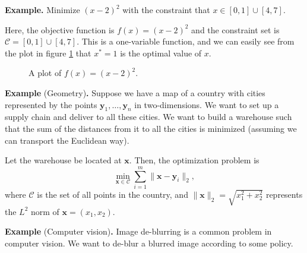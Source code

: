 \documentclass[twoside]{article}
\begin{document}
\textbf{Example.} Minimize $(x - 2)^2$ with the constraint that
$x \in [0, 1] \cup [4, 7].$

Here, the objective function is $f(x) = (x - 2)^2$ and the constraint set is
$\mathscr{C} = [0, 1] \cup [4, 7].$ This is a one-variable function, and we can
easily see from the plot in figure \ref{fig:ex1} that $x^* = 1$ is the optimal
value of $x$.

\begin{figure}[t]
    \centering
    \caption{A plot of $f(x) = (x - 2)^2.$}
    \label{fig:ex1}
\end{figure}

\textbf{Example} (Geometry)\textbf{.} Suppose we have a map of a country with
cities represented by the points $\mathbf{y}_1, \ldots, \mathbf{y}_n$ in
two-dimensions. We want to set up a supply chain and deliver to all these
cities. We want to build a warehouse such that the sum of the distances from it
to all the cities is minimized (assuming we can transport the Euclidean way).

Let the warehouse be located at $\mathbf{x}.$ Then, the optimization problem is
\[
    \min_{\mathbf{x} \in \mathscr{C}}
        \sum_{i = 1}^{m} \|\mathbf{x} - \mathbf{y}_i\|_2,
\] where $\mathscr{C}$ is the set of all points in the country, and
$\| \mathbf{x} \|_2 = \sqrt{x_1^2 + x_2^2}$ represents the $L^2$ norm of
$\mathbf{x} = (x_1, x_2).$


\textbf{Example} (Computer vision)\textbf{.} Image de-blurring is a common
problem in computer vision. We want to de-blur a blurred image according to some
policy.
\end{document}

